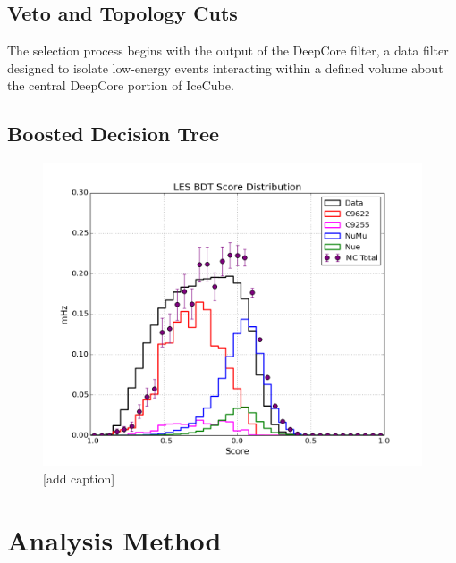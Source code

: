\documentclass[manuscript]{aastex}
\begin{document}
\subsection{Veto and Topology Cuts}
The selection process begins with the output of the DeepCore filter, a data filter designed to isolate low-energy events interacting within a defined volume about the central DeepCore portion of IceCube. 
\subsection{Boosted Decision Tree}

\begin{figure}[ht]
  \begin{center}
    \includegraphics[width=1.0\textwidth,keepaspectratio]{plots/LES_BDTScoreDist_NormalizedRates_WC9255_And_H3AC9622_L6.png}
  \end{center}
  \caption[Low-Energy Event Branch BDT Score Distribution]{[add caption]}
  \label{fig:LESBDTDistribution}
\end{figure}

\section{Analysis Method}
\end{document}

